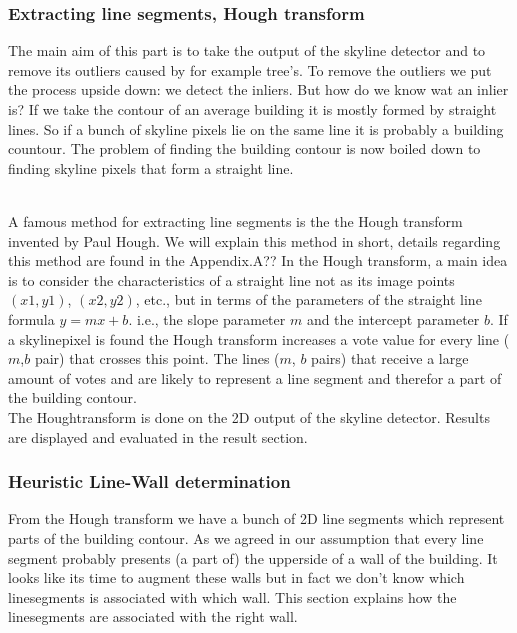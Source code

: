 \subsubsection{Extracting line segments, Hough transform} %

	The main aim of this part is to take the output of the skyline detector and to remove its outliers caused by for example tree's. To remove the outliers we put the process upside down: we detect the inliers.
	But how do we know wat an inlier is?
	If we take the contour of an average building it is mostly formed by straight lines.
	So if a bunch of skyline pixels lie on the same line it is probably a building countour.
	The problem of finding the building contour is now boiled down to finding skyline pixels that form a straight line.

	\\
	A famous method for extracting line segments is the the Hough transform invented by Paul Hough.
	We will explain this method in short, details regarding this method are found in the Appendix.A??%
	In the Hough transform, a main idea is to consider the characteristics of a straight line not as its image points $(x1, y1)$, $(x2, y2)$, etc., but in terms of the parameters of the straight line formula $y = mx + b$. i.e., the slope parameter $m$ and the intercept parameter $b$.
	If a skylinepixel is found the Hough transform increases a vote value for every line ($m$,$b$ pair) that crosses this point.
	The lines ($m$, $b$ pairs) that receive a large amount of votes and are likely to represent a line segment and therefor a part of the building contour.
	\\
	The Houghtransform is done on the 2D output of the skyline detector. Results are displayed and evaluated in the result section.

\subsubsection{Heuristic Line-Wall determination}
	From the Hough transform we have a bunch of 2D line segments which represent parts of the building contour. 
	As we agreed in our assumption that every line segment probably presents (a part of) the upperside of a wall of the building.
	It looks like its time to augment these walls but in fact we don't know which linesegments is associated with which wall.
	This section explains how the linesegments are associated with the right wall.\\

